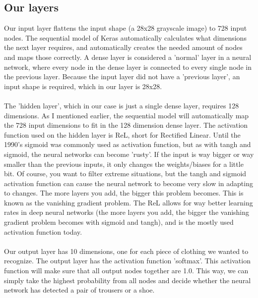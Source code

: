 \documentclass[fleqn,10pt]{SelfArx} %
\begin{document}
\subsection{Our layers}
Our input layer flattens the input shape (a 28x28 grayscale image) to 728 input nodes. The sequential model of Keras automatically calculates what dimensions the next layer requires, and automatically creates the needed amount of nodes and maps those correctly. A dense layer is considered a 'normal' layer in a neural network, where every node in the dense layer is connected to every single node in the previous layer. Because the input layer did not have a 'previous layer', an input shape is required, which in our layer is 28x28.\\ \\ 
The 'hidden layer', which in our case is just a single dense layer, requires 128 dimensions. As I mentioned earlier, the sequential model will automatically map the 728 input dimensions to fit in the 128 dimension dense layer. The activation function used on the hidden layer is ReL, short for Rectified Linear. Until the 1990's sigmoid was commonly used as activation function, but as with tangh and sigmoid, the neural networks can become 'rusty'. If the input is way bigger or way smaller than the previous inputs, it only changes the weights/biases for a little bit. Of course, you want to filter extreme situations, but the tangh and sigmoid activation function can cause the neural network to become very slow in adapting to changes. The more layers you add, the bigger this problem becomes. This is known as the vanishing gradient problem. The ReL allows for way better learning rates in deep neural networks (the more layers you add, the bigger the vanishing gradient problem becomes with sigmoid and tangh), and is the mostly used activation function today.\\ \\
Our output layer has 10 dimensions, one for each piece of clothing we wanted to recognize. The output layer has the activation function 'softmax'. This activation function will make sure that all output nodes together are 1.0. This way, we can simply take the highest probability from all nodes and decide whether the neural network has detected a pair of trousers or a shoe. \\ \\
\end{document}
